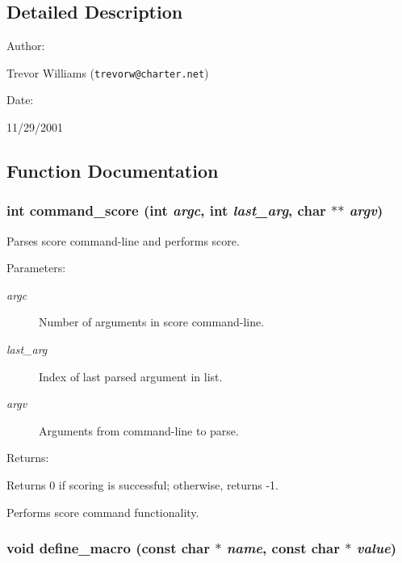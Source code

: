 \subsection{Detailed Description}


\begin{Desc}
\item[Author: ]\par
Trevor Williams ({\tt trevorw@charter.net}) \end{Desc}
\begin{Desc}
\item[Date: ]\par
11/29/2001\end{Desc}


\subsection{Function Documentation}
\subsubsection{\setlength{\rightskip}{0pt plus 5cm}int command\_\-score (int {\em argc}, int {\em last\_\-arg}, char $\ast$$\ast$ {\em argv})}\label{score_8c_a11}


Parses score command-line and performs score.

\begin{Desc}
\item[Parameters: ]\par
\begin{description}
\item[{\em 
argc}]Number of arguments in score command-line. \item[{\em 
last\_\-arg}]Index of last parsed argument in list. \item[{\em 
argv}]Arguments from command-line to parse.\end{description}
\end{Desc}
\begin{Desc}
\item[Returns: ]\par
Returns 0 if scoring is successful; otherwise, returns -1.\end{Desc}
Performs score command functionality. 
\subsubsection{\setlength{\rightskip}{0pt plus 5cm}void define\_\-macro (const char $\ast$ {\em name}, const char $\ast$ {\em value})}\label{score_8c_a7}


